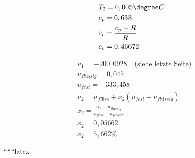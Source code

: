 \begin{align*}
    &T_2 = 0,005 \degree C \\
    &c_p = 0,633 \\
    &c_v = \frac{c_p - R}{R} \\
    &c_v = 0,46672
\end{align*}

\begin{align*}
    &u_1 = -200,0928 \quad \text{(siehe letzte Seite)} \\
    &u_{flüssig} = 0,045 \\
    &u_{fest} = -333,458 \\
    &u_2 = u_{flüss} + x_2 (u_{fest} - u_{flüssig}) \\
    &x_2 = \frac{u_2 - u_{flüssig}}{u_{fest} - u_{flüssig}} \\
    &x_2 = 0,05662 \\
    &x_2 = 5,662 \%
\end{align*}

``````latex


